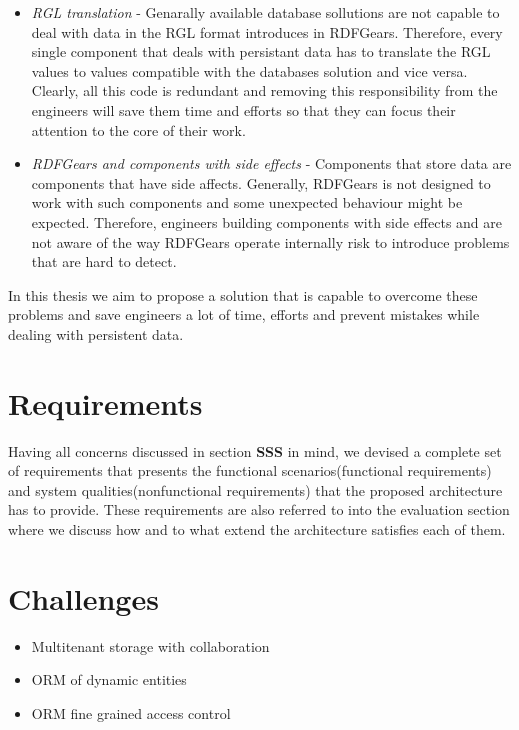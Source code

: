 \documentclass[a4paper, notitlepage]{article}
\begin{document}
\begin{itemize}
	\item \textit{RGL translation} - Genarally available database sollutions are not capable to deal with data in the RGL format introduces in RDFGears. Therefore, every single component that deals with persistant data has to translate the RGL values to values compatible with the databases solution and vice versa. Clearly, all this code is redundant and removing this responsibility from the engineers will save them time and efforts so that they can focus their attention to the core of their work.
	
	\item \textit{RDFGears and components with side effects} - Components that store data are components that have side affects. Generally, RDFGears is not designed to work with such components and some unexpected behaviour might be expected. Therefore, engineers building components with side effects and are not aware of the way RDFGears operate internally risk to introduce problems that are hard to detect.
	
\end{itemize}

In this thesis we aim to propose a solution that is capable to overcome these problems and save engineers a lot of time, efforts and prevent mistakes while dealing with persistent data.

\section{Requirements}

Having all concerns discussed in section \textbf{SSS} in mind, we devised a complete set of requirements that presents the functional scenarios(functional requirements) and system qualities(nonfunctional requirements) that the proposed architecture has to provide. These requirements are also referred to into the evaluation section where we discuss how and to what extend the architecture satisfies each of them.

\section{Challenges}

\begin{itemize}
	\item Multitenant storage with collaboration
	\item ORM of dynamic entities
	\item ORM fine grained access control
\end{itemize}
\end{document}

